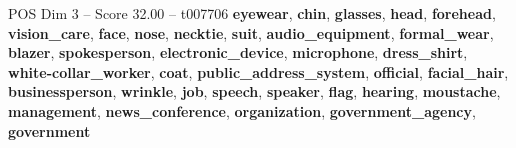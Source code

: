 \begin{textsample}{POS Dim 3 – Score 32.00 – t007706}  \label{ex:f3_pos_013}
\textbf{eyewear}, \textbf{chin}, \textbf{glasses}, \textbf{head}, \textbf{forehead}, \textbf{vision\_care}, \textbf{face}, \textbf{nose}, \textbf{necktie}, \textbf{suit}, \textbf{audio\_equipment}, \textbf{formal\_wear}, \textbf{blazer}, \textbf{spokesperson}, \textbf{electronic\_device}, \textbf{microphone}, \textbf{dress\_shirt}, \textbf{white-collar\_worker}, \textbf{coat}, \textbf{public\_address\_system}, \textbf{official}, \textbf{facial\_hair}, \textbf{businessperson}, \textbf{wrinkle}, \textbf{job}, \textbf{speech}, \textbf{speaker}, \textbf{flag}, \textbf{hearing}, \textbf{moustache}, \textbf{management}, \textbf{news\_conference}, \textbf{organization}, \textbf{government\_agency}, \textbf{government}

\end{textsample}
